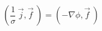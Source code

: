 \begin{equation}
\left( \frac{1}{\sigma}~\vec{j}, \vec{f}~ \right) =
\left( - \nabla \phi, \vec{f} ~ \right)
\end{equation}
